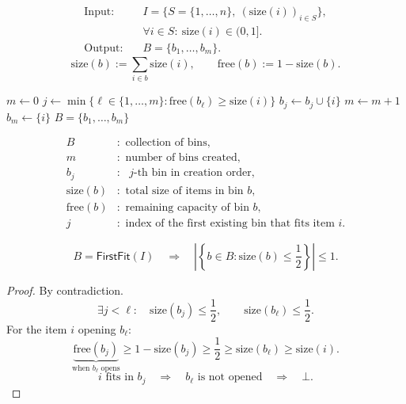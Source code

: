 \documentclass[12pt,a4paper]{article}
\begin{document}
\begin{definition}
\[
\begin{aligned}
\text{Input:}\quad&I=\{S=\{1,\ldots,n\},\ (\mathrm{size}(i))_{i\in S}\},\\
&
\forall i\in S:\ \mathrm{size}(i)\in(0,1].\\[3pt]
\text{Output:}\quad&B=\{b_1,\ldots,b_m\}.
\end{aligned}
\]
\[
\mathrm{size}(b):=\sum_{i\in b}\mathrm{size}(i),\qquad
\mathrm{free}(b):=1-\mathrm{size}(b).
\]
\begin{algorithm}[H]
\caption{$\mathsf{FirstFit}(I)$}
\begin{algorithmic}[1]
\State $m\gets0$
        \State $j\gets\min\{\ell\in\{1,\ldots,m\}:\mathrm{free}(b_\ell)\geq\mathrm{size}(i)\}$
        \State $b_j\gets b_j\cup\{i\}$
    \Else
        \State $m\gets m+1$
        \State $b_m\gets\{i\}$
    \EndIf
\EndFor
\State \Return $B=\{b_1,\ldots,b_m\}$
\end{algorithmic}
\end{algorithm}
\[
\begin{aligned}
B&:\text{ collection of bins},\\
m&:\text{ number of bins created},\\
b_j&:\text{ }j\text{-th bin in creation order},\\
\mathrm{size}(b)&:\text{ total size of items in bin }b,\\
\mathrm{free}(b)&:\text{ remaining capacity of bin }b,\\
j&:\text{ index of the first existing bin that fits item }i.
\end{aligned}
\]
\end{definition}

\begin{lemma}
\label{lem:firstfit-half-full}
\[
B=\mathsf{FirstFit}(I)
\quad\Longrightarrow\quad
\left|\left\{b\in B:\mathrm{size}(b)\leq\frac12\right\}\right|\leq1.
\]
\end{lemma}
\begin{proof}
By contradiction.
\[
\exists j<\ell:\quad
\mathrm{size}(b_j)\leq\frac12,\qquad\mathrm{size}(b_\ell)\leq\frac12.
\]
For the item $i$ opening $b_\ell$:
\[
\underbrace{
\mathrm{free}(b_j)
}_{\text{when }b_\ell\text{ opens}}
\geq1-\mathrm{size}(b_j)
\geq\frac12
\geq\mathrm{size}(b_\ell)
\geq\mathrm{size}(i).
\]
\[
i\text{ fits in }b_j
\quad\Longrightarrow\quad b_\ell\text{ is not opened}
\quad\Longrightarrow\quad\bot.
\]
\end{proof}
\end{document}
